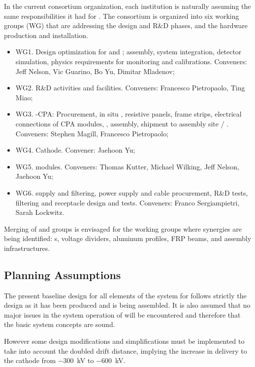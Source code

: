 In the current  consortium organization, each institution is naturally assuming the same responsibilities %
it had for . The consortium is organized into six working groups (WG) that are addressing the design and  R\&D phases, and the hardware production and installation.

\begin{itemize}
\item WG1. Design optimization for \single and \dual; assembly, system integration, detector simulation, physics requirements for monitoring and calibrations. Conveners: Jeff Nelson, Vic Guarino, Bo Yu, Dimitar Mladenov;
\item WG2. R\&D activities and facilities. Conveners: Francesco Pietropaolo, Ting Miao;
\item WG3. \single{}-CPA: Procurement, in situ , resistive panels, frame strips, electrical connections of CPA modules, , assembly, shipment to assembly site / . Conveners: Stephen Magill, Francesco Pietropaolo;
\item WG4. \dual Cathode. Convener: Jaehoon Yu;
\item WG5. \fc modules. Conveners: Thomas Kutter, Michael Wilking, Jeff Nelson, Jaehoon Yu;
\item WG6.  supply and filtering,  power supply and cable procurement, R\&D tests, filtering and receptacle design and tests. Conveners: Franco Sergiampietri, Sarah Lockwitz.
\end{itemize}

\noindent Merging of \single and \dual groups is envisaged for the working groups where synergies are being identified:  \fdth{}s, voltage dividers, aluminum profiles, FRP beams, and assembly infrastructures.

\subsection{Planning Assumptions}
\label{sec:fddp-hv-org-assmp}
The present baseline design for all elements of the  system for  follows strictly the  design as it has been produced and is being assembled.  It is also assumed that no major issues in the \hv system operation of  will be encountered and therefore that the basic \hv system concepts are sound.

However some design modifications and simplifications must be implemented to take into account the %
doubled drift distance, implying the increase in \hv delivery to the cathode from \SI{-300}{\kV} to \SI{-600}{\kV}.

